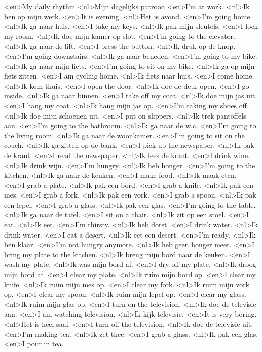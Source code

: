 <en>My daily rhythm
<nl>Mijn dagelijks patroon 
<en>I'm at work.
<nl>Ik ben op mijn werk.
<en>It is evening.
<nl>Het is avond.
<en>I'm going home.
<nl>Ik ga naar huis.
<en>I take my keys.
<nl>Ik pak mijn sleutels.
<en>I lock my room.
<nl>Ik doe mijn kamer op slot.
<en>I'm going to the elevator.
<nl>Ik ga naar de lift.
<en>I press the button.
<nl>Ik druk op de knop.
<en>I'm going downstairs.
<nl>Ik ga naar beneden.
<en>I'm going to my bike.
<nl>Ik ga naar mijn fiets.
<en>I'm going to sit on my bike.
<nl>Ik ga op mijn fiets zitten.
<en>I am cycling home.
<nl>Ik fiets naar huis.
<en>I come home.
<nl>Ik kom thuis.
<en>I open the door.
<nl>Ik doe de deur open.
<en>I go inside.
<nl>Ik ga naar binnen.
<en>I take off my coat.
<nl>Ik doe mijn jas uit.
<en>I hang my coat.
<nl>Ik hang mijn jas op.
<en>I'm taking my shoes off.
<nl>Ik doe mijn schoenen uit.
<en>I put on slippers.
<nl>Ik trek pantoffels aan.
<en>I'm going to the bathroom.
<nl>Ik ga naar de w.c.
<en>I'm going to the living room.
<nl>Ik ga naar de woonkamer.
<en>I'm going to sit on the couch.
<nl>Ik ga zitten op de bank.
<en>I pick up the newspaper.
<nl>Ik pak de krant.
<en>I read the newspaper.
<nl>Ik lees de krant.
<en>I drink wine.
<nl>Ik drink wijn.
<en>I'm hungry.
<nl>Ik heb honger.
<en>I'm going to the kitchen.
<nl>Ik ga naar de keuken.
<en>I make food.
<nl>Ik maak eten.
<en>I grab a plate.
<nl>Ik pak een bord.
<en>I grab a knife.
<nl>Ik pak een mes.
<en>I grab a fork.
<nl>Ik pak een vork.
<en>I grab a spoon.
<nl>Ik pak een lepel.
<en>I grab a glass.
<nl>Ik pak een glas.
<en>I'm going to the table.
<nl>Ik ga naar de tafel.
<en>I sit on a chair.
<nl>Ik zit op een stoel.
<en>I eat.
<nl>Ik eet.
<en>I'm thirsty.
<nl>Ik heb dorst.
<en>I drink water.
<nl>Ik drink water.
<en>I eat a desert.
<nl>Ik eet een desert.
<en>I'm ready.
<nl>Ik ben klaar.
<en>I'm not hungry anymore.
<nl>Ik heb geen honger meer.
<en>I bring my plate to the kitchen.
<nl>Ik breng mijn bord naar de keuken.
<en>I wash my plate.
<nl>Ik was mijn bord af.
<en>I dry off my plate.
<nl>Ik droog mijn bord af.
<en>I clear my plate.
<nl>Ik ruim mijn bord op.
<en>I clear my knife.
<nl>Ik ruim mijn mes op.
<en>I clear my fork.
<nl>Ik ruim mijn vork op.
<en>I clear my spoon.
<nl>Ik ruim mijn lepel op.
<en>I clear my glass.
<nl>Ik ruim mijn glas op.
<en>I turn on the television.
<nl>Ik doe de televisie aan.
<en>I am watching television.
<nl>Ik kijk televisie.
<en>It is very boring.
<nl>Het is heel saai.
<en>I turn off the television.
<nl>Ik doe de televisie uit.
<en>I'm making tea.
<nl>Ik zet thee.
<en>I grab a glass.
<nl>Ik pak een glas.
<en>I pour in tea.
